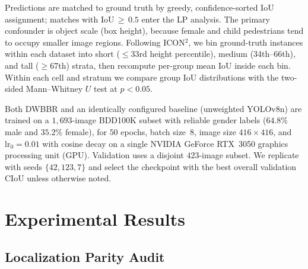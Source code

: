 \documentclass[runningheads]{llncs}
\begin{document}
Predictions are matched to ground truth by greedy, confidence-sorted IoU
assignment; matches with IoU\,$\geq$\,$0.5$ enter the LP analysis. The primary
confounder is object scale (box height), because female and child pedestrians
tend to occupy smaller image regions. Following ICON$^2$, we bin ground-truth
instances within each dataset into short ($\leq$33rd height percentile), medium
(34th--66th), and tall ($\geq$67th) strata, then recompute per-group mean IoU
inside each bin. Within each cell and stratum we compare group IoU distributions
with the two-sided Mann--Whitney $U$ test at $p<0.05$.

Both DWBBR and an identically configured baseline (unweighted YOLOv8n) are
trained on a $1{,}693$-image BDD100K subset with reliable gender labels
($64.8\%$ male and $35.2\%$ female), for $50$ epochs, batch size~$8$, image size
$416\times416$, and $\mathrm{lr}_0=0.01$ with cosine decay on a single NVIDIA
GeForce RTX~3050 graphics processing unit (GPU). Validation uses a disjoint
$423$-image subset. We replicate with seeds $\{42,123,7\}$ and select the
checkpoint with the best overall validation CIoU unless otherwise noted.

\section{Experimental Results}
\label{sec:results}

\subsection{Localization Parity Audit}
\label{sec:audit}
\end{document}
